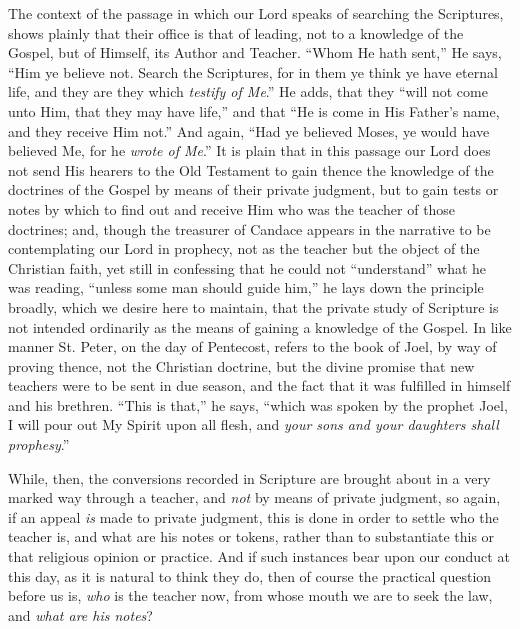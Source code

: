The context of the passage in which our Lord speaks of searching
the Scriptures, shows plainly that their office is that of leading,
not to a knowledge of the Gospel, but of Himself, its Author and
Teacher. ``Whom He hath sent,'' He says, ``Him ye believe
not. Search the Scriptures, for in them ye think ye have eternal life,
and they are they which \emph{testify of Me}.'' He adds, that
they ``will not come unto Him, that they may have
life,'' and that ``He is come in His Father's name, and they
receive Him not.'' And again, ``Had ye believed Moses, ye
would have believed Me, for he \emph{wrote of Me}.'' It is plain
that in this passage our Lord does not send His hearers to the Old
Testament to gain thence the knowledge of the doctrines of the Gospel
by means of their private judgment, but to gain tests or notes by
which to find out and receive Him who was the teacher of those
doctrines; and, though the treasurer of Candace appears in the
narrative to be contemplating our Lord in prophecy, not as the teacher
but the object of the Christian faith, yet still in confessing that he
could not ``understand'' what he was reading, ``unless
some man should guide him,'' he lays down the principle broadly,
which we desire here to maintain, that the private study of Scripture
is not intended ordinarily as the means of gaining a knowledge of the
Gospel. In like manner St. Peter, on the day of Pentecost, refers to
the book of Joel, by way of proving thence, not the Christian
doctrine, but the divine promise that new teachers were to be sent in
due season, and the fact that it was fulfilled in himself and his
brethren. ``This is that,'' he says, ``which was spoken by
the prophet Joel, I will pour out My Spirit upon all flesh, and \emph{your
sons and your daughters shall prophesy}.''

While, then, the conversions recorded in Scripture are brought
about in a very marked way through a teacher, and \emph{not} by means of
private judgment, so again, if an appeal \emph{is} made to private judgment,
this is done in order to settle who the teacher is, and what are his
notes or tokens, rather than to substantiate this or that religious
opinion or practice. And if such instances bear upon our conduct at
this day, as it is natural to think they do, then of course the
practical question before us is, \emph{who} is the teacher now, from
whose mouth we are to seek the law, and \emph{what are his notes}?

